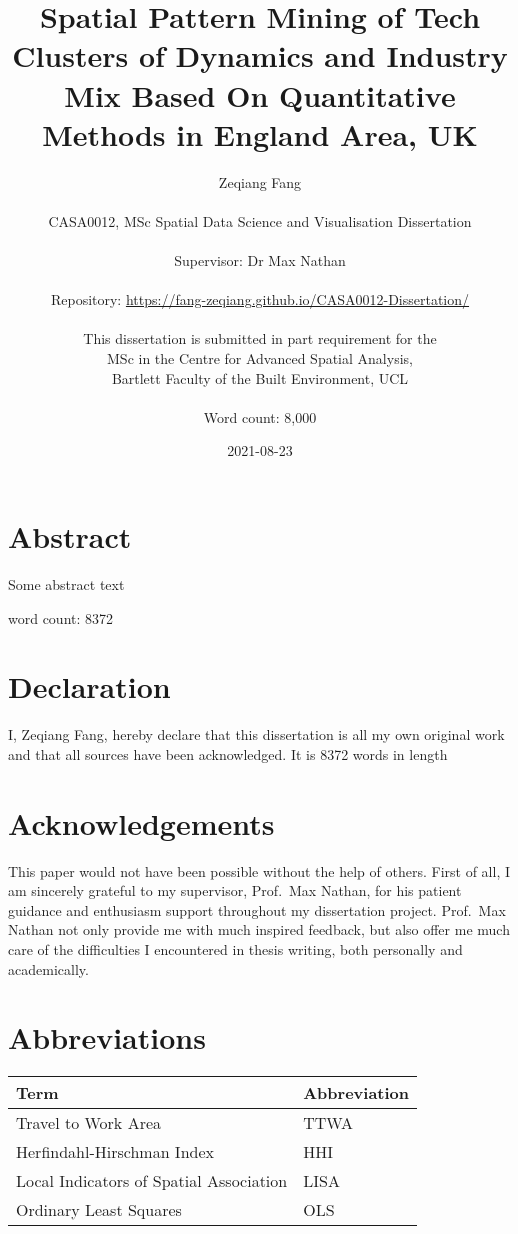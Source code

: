 \documentclass[
  12pt,
  oneside]{book}
\title{Spatial Pattern Mining of Tech Clusters of Dynamics and Industry Mix Based On Quantitative Methods in England Area, UK}
\author{Zeqiang Fang\\
~\\
CASA0012, MSc Spatial Data Science and Visualisation Dissertation\\
~\\
Supervisor: Dr Max Nathan\\
~\\
Repository: \url{https://fang-zeqiang.github.io/CASA0012-Dissertation/}\\
~\\
This dissertation is submitted in part requirement for the\\
MSc in the Centre for Advanced Spatial Analysis,\\
Bartlett Faculty of the Built Environment, UCL\\
~\\
Word count: 8,000}
\date{2021-08-23}
\begin{document}
\maketitle


\hypertarget{abstract}{%
\chapter*{Abstract}\label{abstract}}

Some abstract text

word count: 8372


\hypertarget{declaration}{%
\chapter*{Declaration}\label{declaration}}

I, Zeqiang Fang, hereby declare that this dissertation is all my own original work and that all sources have been acknowledged. It is 8372 words in length

\hypertarget{acknowledgements}{%
\chapter*{Acknowledgements}\label{acknowledgements}}

This paper would not have been possible without the help of others. First of all, I am sincerely grateful to my supervisor, Prof.~Max Nathan, for his patient guidance and enthusiasm support throughout my dissertation project. Prof.~Max Nathan not only provide me with much inspired feedback, but also offer me much care of the difficulties I encountered in thesis writing, both personally and academically.

\setcounter{tocdepth}{3}
\tableofcontents
\listoffigures
\listoftables

\hypertarget{abbreviations}{%
\chapter*{Abbreviations}\label{abbreviations}}

\begin{table}
\centering
\begin{tabular}{ll}
\toprule
\textbf{Term} & \textbf{Abbreviation}\\
\midrule
Travel to Work Area & TTWA\\
Herfindahl-Hirschman Index & HHI\\
Local Indicators of Spatial Association & LISA\\
Ordinary Least Squares & OLS\\
\bottomrule
\end{tabular}
\end{table}
\end{document}

